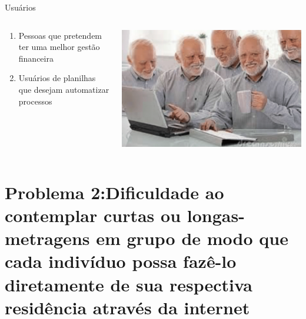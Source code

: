 \documentclass[12pt]{beamer}
\def\newline{}%
\begin{document}
\begin{frame}{Usuários}
    \begin{columns}
        \begin{column}{0.65\textwidth}
            \begin{enumerate}[label=•]
                \item Pessoas que pretendem ter uma melhor gestão financeira
                \item Usuários de planilhas que desejam automatizar processos
            \end{enumerate}
        \end{column}
        
        \begin{column}{0.35\textwidth}
            \begin{center}
                \includegraphics[width=1\textwidth]{figuras/haroldusuarios.png}
             \end{center}
        \end{column}
    \end{columns}
\end{frame}

\section{Problema 2:\newline Dificuldade ao contemplar curtas ou longas-metragens em grupo de modo que cada indivíduo possa fazê-lo diretamente de sua respectiva residência através da internet}
\end{document}
